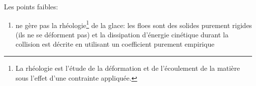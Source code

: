\documentclass[
  french,
	11pt, %
]{fphw}
\begin{document}
Les points faibles:
\begin{enumerate}
  \item ne gère pas la rhéologie\footnote{La rhéologie est l'étude de la déformation et de l'écoulement de la matière sous l'effet d'une contrainte appliquée.} de la glace: les floes sont des solides purement rigides (ils ne se déforment pas) et la dissipation d’énergie cinétique durant la collision est décrite en utilisant un coefficient purement empirique
\end{enumerate}






\end{document}
